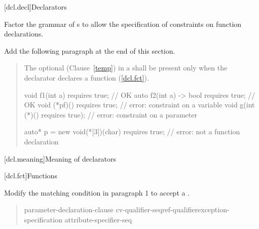 
[dcl.decl]{Declarators}

Factor the grammar of s to
allow the specification of constraints on function declarations.

\begin{quote}
\setcounter{Paras}{3}
\begin{bnf}
\br
    \br
    \br

\end{bnf}
\end{quote}


Add the following paragraph at the end of this section.

\begin{quote}
The optional  (Clause~\ref{temp}) in a
 shall be present only when
the declarator declares a function (\ref{dcl.fct}).

\enterexample
\begin{codeblock}
void f1(int a) requires true;         // OK
auto f2(int a) -> bool requires true; // OK
void (*pf)() requires true;           // error: constraint on a variable
void g(int (*)() requires true);      // error: constraint on a parameter
  
auto* p = new void(*[3])(char) requires true; // error: not a function declaration
\end{codeblock}
\exitexample
\end{quote}


\setcounter{section}{2}
[dcl.meaning]{Meaning of declarators}


\setcounter{section}{4}
[dcl.fct]{Functions}

Modify the matching condition in paragraph 1 to accept a 
.
      
\begin{quote}
\pnum
\begin{bnf}
 \terminal{(} parameter-declaration-clause \terminal{)}
  cv-qualifier-seq\opt ref-qualifier\opt exception-specification\opt
  attribute-specifier-seq\opt {}
\end{bnf}
\end{quote}

